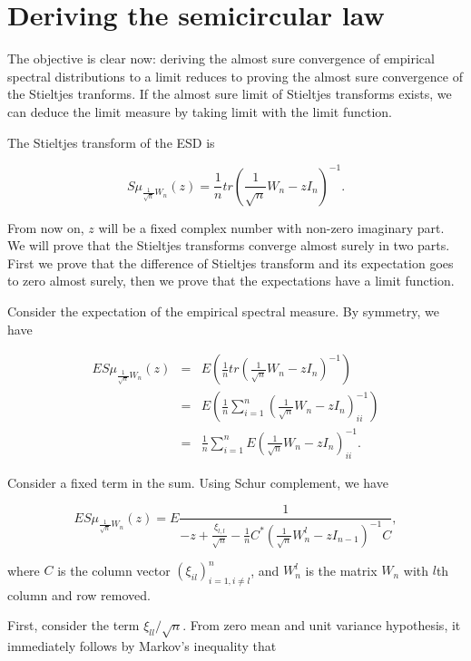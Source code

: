 \documentclass[12pt,a4paper,leqno]{report}
\theoremstyle{plain}
\theoremstyle{definition}
\theoremstyle{remark}
\begin{document}
\chapter{Deriving the semicircular law}\label{semic}

The objective is clear now: deriving the almost sure convergence of empirical spectral distributions to a limit reduces to proving the almost sure convergence of the Stieltjes tranforms.
If the almost sure limit of Stieltjes transforms exists, we can deduce the limit measure by taking limit with the limit function.

The Stieltjes transform of the ESD is

\begin{equation}
S\mu_{\frac{1}{\sqrt{n}}W_n}(z) = \frac{1}{n} tr(\frac{1}{\sqrt{n}}W_n - z I_n)^{-1}.
\end{equation}

From now on, $z$ will be a fixed complex number with non-zero imaginary part. We will prove that the Stieltjes transforms converge almost surely in two parts. First we prove that the difference of Stieltjes transform and its expectation goes to zero almost surely, then we prove that the expectations have a limit function.

Consider the expectation of the empirical spectral measure.  By symmetry, we have

\begin{eqnarray*}
ES\mu_{\frac{1}{\sqrt{n}}W_n}(z) & = &
E(\frac{1}{n} tr(\frac{1}{\sqrt{n}}W_n - z I_n)^{-1})\\
& = & E(\frac{1}{n} \sum_{i=1}^n(\frac{1}{\sqrt{n}}W_n - z I_n)^{-1}_{ii})\\
& = & \frac{1}{n} \sum_{i=1}^n E(\frac{1}{\sqrt{n}}W_n - z I_n)^{-1}_{ii}.
\end{eqnarray*}

Consider a fixed term in the sum.
Using Schur complement, we have

\begin{equation*}
ES\mu_{\frac{1}{\sqrt{n}}W_n}(z) = E\frac{1}{-z+\frac{\xi_{l,l}}{\sqrt{n}}-\frac{1}{n}C^* (\frac{1}{\sqrt{n}}W_n^l-zI_{n-1})^{-1}C},
\end{equation*}

where $C$ is the column vector $(\xi_{il})_{i=1, i\neq l}^{n}$, and $W_n^l$ is the matrix $W_n$ with $l$th column and row removed.

First, consider the term $\xi_{ll}/\sqrt{n}$. From zero mean and unit variance hypothesis, it immediately follows by Markov's inequality that
\end{document}
